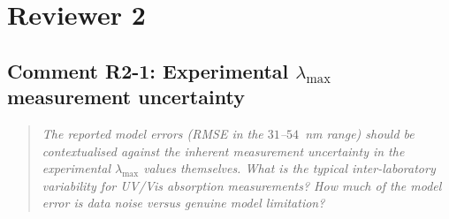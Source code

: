 \documentclass[11pt]{article}
\newenvironment{reviewer}{%
  \begin{quote}\itshape\color{black!70}}{%
  \end{quote}}
\begin{document}
\section*{Reviewer 2}

\subsection*{Comment R2-1: Experimental $\lambda_{\max}$ measurement uncertainty}
\begin{reviewer}
The reported model errors (RMSE in the $31$--$54$~nm range) should be contextualised against the inherent measurement uncertainty in the experimental $\lambda_{\max}$ values themselves. What is the typical inter-laboratory variability for UV/Vis absorption measurements? How much of the model error is data noise versus genuine model limitation?
\end{reviewer}
\end{document}

